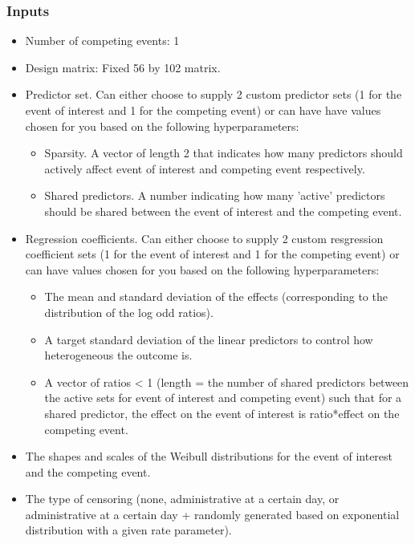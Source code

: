 \documentclass[11pt,a4paper]{article}
\begin{document}
\subsubsection{Inputs}
\begin{itemize}
    \item Number of competing events: 1
    \item Design matrix: Fixed 56 by 102 matrix. 
    \item Predictor set. Can either choose to supply 2 custom predictor sets (1 for the event of interest and 1 for the competing event) or can have have values chosen for you based on the following hyperparameters:
    \begin{itemize}
        \item Sparsity. A vector of length 2 that indicates how many predictors should actively affect event of interest and competing event respectively. 
        \item Shared predictors. A number indicating how many 'active' predictors should be shared between the event of interest and the competing event.
    \end{itemize}
    \item Regression coefficients. Can either choose to supply 2 custom resgression coefficient sets (1 for the event of interest and 1 for the competing event) or can have values chosen for you based on the following hyperparameters:
    \begin{itemize}
        \item The mean and standard deviation of the effects (corresponding to the distribution of the log odd ratios).
        \item  A target standard deviation of the linear predictors to control how heterogeneous the outcome is. 
        \item A vector of ratios < 1 (length = the number of shared predictors between the active sets for event of interest and competing event) such that for a shared predictor, the effect on the event of interest is ratio*effect on the competing event. 
    \end{itemize}
    \item The shapes and scales of the Weibull distributions for the event of interest and the competing event.
    \item The type of censoring (none, administrative at a certain day, or administrative at a certain day + randomly generated based on exponential distribution with a given rate parameter). 
\end{itemize}
\end{document}
